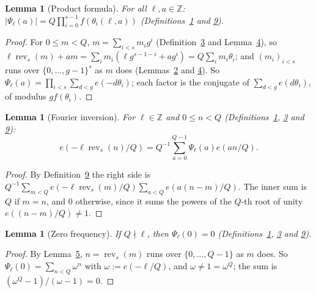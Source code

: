\documentclass[11pt]{article}
\newcounter{hffc}
\theoremstyle{definition}\newtheorem{hffdef}[hffc]{Definition}
\theoremstyle{plain}\newtheorem{hfflem}[hffc]{Lemma}\newtheorem{hffthm}[hffc]{Theorem}
\theoremstyle{remark}\newtheorem{hffrem}[hffc]{Remark}
\newcommand{\hffcost}{}
\newcommand{\setcost}[1]{\renewcommand{\hffcost}{#1}}
\newcommand{\rev}{\operatorname{rev}}
\newcommand{\Z}{\mathbb{Z}}\newcommand{\R}{\mathbb{R}}\newcommand{\N}{\mathbb{N}}
\begin{document}
\begin{hfflem}[Product formula]\label{L:prod}
For all $\ell,a\in\Z$: $|\Psi_\ell(a)|=Q\prod_{i=0}^{s-1}f(\theta_i(\ell,a))$ (Definitions~\hyperref[D:conv]{1} and \hyperref[D:psi]{9}).
\par\nopagebreak{}
\end{hfflem}
\begin{proof}\setcost{length 204/300}For $0\le m<Q$, $m=\sum_{i<s}m_ig^i$ (Definition~\hyperref[D:digits]{3} and Lemma~\hyperref[L:window]{4}), so $\ell\rev_s(m)+am=\sum_im_i(\ell g^{s-1-i}+ag^i)=Q\sum_im_i\theta_i$; and $(m_i)_{i<s}$ runs over $\{0,\dots,g-1\}^s$ as $m$ does (Lemmas~\hyperref[L:digits]{2} and \hyperref[L:window]{4}). So $\Psi_\ell(a)=\prod_{i<s}\sum_{d<g}e(-d\theta_i)$; each factor is the conjugate of $\sum_{d<g}e(d\theta_i)$, of modulus $gf(\theta_i)$.
\end{proof}

\begin{hfflem}[Fourier inversion]\label{L:fourier}
For $\ell\in\Z$ and $0\le n<Q$ (Definitions~\hyperref[D:conv]{1}, \hyperref[D:digits]{3} and \hyperref[D:psi]{9}): \[e(-\ell\rev_s(n)/Q)=Q^{-1}\sum_{a=0}^{Q-1}\Psi_\ell(a)e(an/Q).\]
\par\nopagebreak{}
\end{hfflem}
\begin{proof}\setcost{length 150/300}By Definition~\hyperref[D:psi]{9} the right side is $Q^{-1}\sum_{m<Q}e(-\ell\rev_s(m)/Q)\sum_{a<Q}e(a(n-m)/Q)$. The inner sum is $Q$ if $m=n$, and $0$ otherwise, since it sums the powers of the $Q$-th root of unity $e((n-m)/Q)\ne1$.
\end{proof}

\begin{hfflem}[Zero frequency]\label{L:zero}
If $Q\nmid\ell$, then $\Psi_\ell(0)=0$ (Definitions~\hyperref[D:conv]{1}, \hyperref[D:digits]{3} and \hyperref[D:psi]{9}).
\par\nopagebreak{}
\end{hfflem}
\begin{proof}\setcost{length 107/300}By Lemma~\hyperref[L:inv]{5}, $n=\rev_s(m)$ runs over $\{0,\dots,Q-1\}$ as $m$ does. So $\Psi_\ell(0)=\sum_{n<Q}\omega^n$ with $\omega:=e(-\ell/Q)$, and $\omega\ne1=\omega^Q$; the sum is $(\omega^Q-1)/(\omega-1)=0$.
\end{proof}
\end{document}
